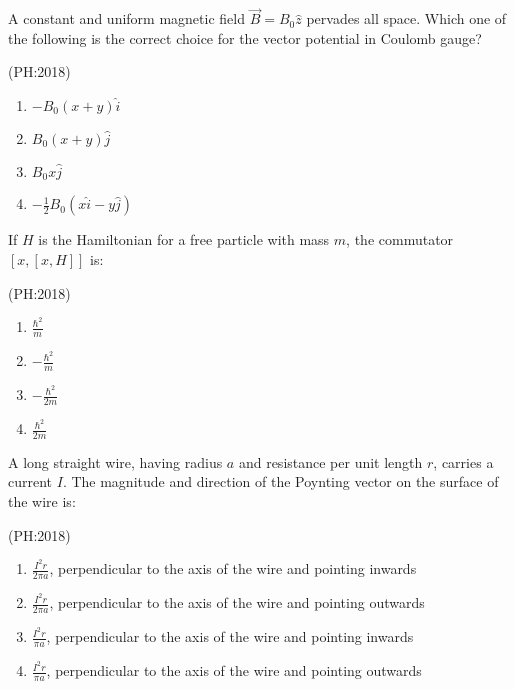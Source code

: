     \item A constant and uniform magnetic field $\vec{B} = B_0 \hat{z}$ pervades all space. Which one of the following is the correct choice for the vector potential in Coulomb gauge?

    \hfill{(PH:2018)}
		\begin{multicols}{4}
    \begin{enumerate}
        \item $-B_0(x + y)\hat{i}$
        \item $B_0(x + y)\hat{j}$
        \item $B_0 x \hat{j}$
        \item $-\frac{1}{2} B_0 (x\hat{i} - y\hat{j})$
    \end{enumerate}
			\end{multicols}
    

    \item If $H$ is the Hamiltonian for a free particle with mass $m$, the commutator $[x, [x, H]]$ is:

    \hfill{(PH:2018)}
		\begin{multicols}{4}
    \begin{enumerate}
        \item $\frac{\hbar^2}{m}$
        \item $-\frac{\hbar^2}{m}$
        \item $-\frac{\hbar^2}{2m}$
        \item $\frac{\hbar^2}{2m}$
    \end{enumerate}
			\end{multicols}
 

    \item A long straight wire, having radius $a$ and resistance per unit length $r$, carries a current $I$. The magnitude and direction of the Poynting vector on the surface of the wire is:

    \hfill{(PH:2018)}
    \begin{enumerate}
        \item $\frac{I^2 r}{2\pi a}$, perpendicular to the axis of the wire and pointing inwards
        \item $\frac{I^2 r}{2\pi a}$, perpendicular to the axis of the wire and pointing outwards
        \item $\frac{I^2 r}{\pi a}$, perpendicular to the axis of the wire and pointing inwards
        \item $\frac{I^2 r}{\pi a}$, perpendicular to the axis of the wire and pointing outwards
    \end{enumerate}
   

